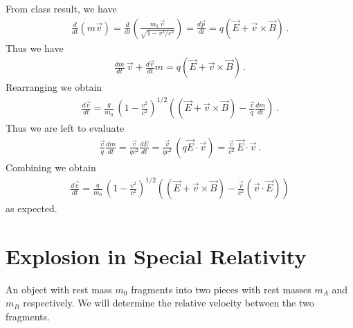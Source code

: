\documentclass[11pt, onesided]{book}
\theoremstyle{break}
\theoremstyle{break}
\begin{document}

From class result, we have
\begin{align*}
\frac{d}{dt} (m\vec{v}) = \frac{d}{dt}\left( \frac{m_0\,\vec{v}}{\sqrt{1 - v^2/c^2}}\right) = \frac{d\vec{p}}{dt} = q\left(\vec{E} + \vec{v}\times \vec{B}\right)\,.
\end{align*}
Thus we have
\begin{align*}
\frac{dm}{dt}\, \vec{v} + \frac{d\vec{v}}{dt}m = q(\vec{E}+ \vec{v}\times \vec{B})\,.
\end{align*}
Rearranging we obtain
\begin{align*}
\frac{d\vec{v}}{dt} = 
\frac{q}{m_0}\,\left( 1-\frac{v^2}{c^2}\right)^{1/2}
\left(
(\vec{E}+ \vec{v}\times \vec{B})
-
\frac{\vec{v}}{q} \frac{dm}{dt}\right)\,.
\end{align*}
Thus we are left to evaluate
\begin{align*}
\frac{\vec{v}}{q} \frac{dm}{dt} = \frac{\vec{v}}{qc^2} \frac{dE}{dt} = \frac{\vec{v}}{qc^2}\,(q\vec{E}\cdot \vec{v}) = \frac{\vec{v}}{c^2}\, \vec{E}\cdot \vec{v}\,.
\end{align*}
Combining we obtain
\begin{align*}
\frac{d\vec{v}}{dt} = \frac{q}{m_0}\,\left( 1-\frac{v^2}{c^2}\right)^{1/2}
\left(
(\vec{E}+ \vec{v}\times \vec{B})
-
\frac{\vec{v}}{c^2} (\vec{v}\cdot \vec{E})\right)
\end{align*}
as expected. 

\newpage
\section{Explosion in Special Relativity}
An object with rest mass $m_0$ fragments into two pieces with rest masses $m_A$ and $m_B$ respectively. We will determine the relative velocity between the two fragments.\\
\end{document}

